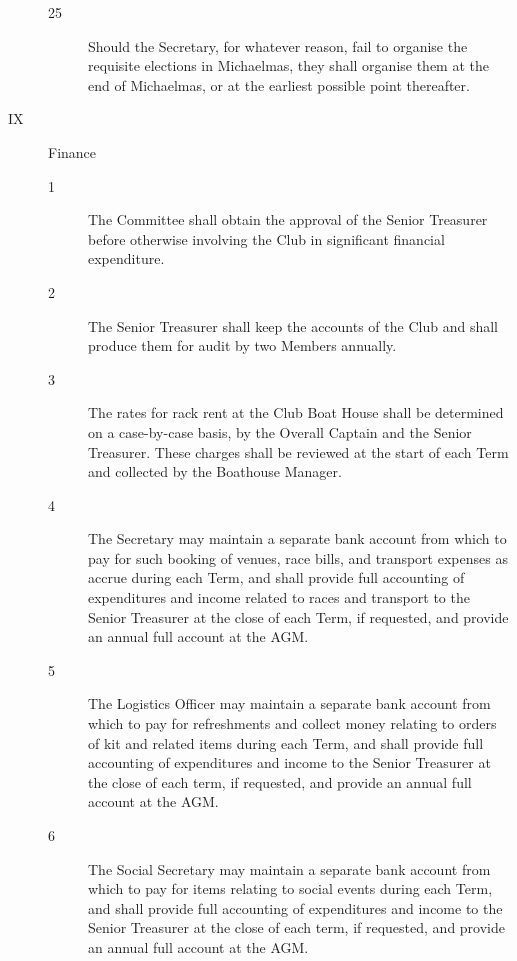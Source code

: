 \documentclass{article}
\begin{document}
\begin{description}
\begin{description}
		\item[25] Should the Secretary, for whatever reason, fail to organise the requisite
		elections in Michaelmas, they shall organise them at the end of
		Michaelmas, or at the earliest possible point thereafter.\\
	\end{description}

	\item[IX] Finance
	\begin{description}
		\item[1] The Committee shall obtain the approval of the Senior Treasurer before
		otherwise involving the Club in significant financial expenditure.\\
		
		\item[2] The Senior Treasurer shall keep the accounts of the Club and shall produce
		them for audit by two Members annually.\\
		
		\item[3] The rates for rack rent at the Club Boat House shall be determined on a
		case-by-case basis, by the Overall Captain and the Senior Treasurer. These
		charges shall be reviewed at the start of each Term and collected by the
		Boathouse Manager.\\
		
		\item[4] The Secretary may maintain a separate bank account from which to pay for
		such booking of venues, race bills, and transport expenses as accrue during
		each Term, and shall provide full accounting of expenditures and income
		related to races and transport to the Senior Treasurer at the close of each Term,
		if requested, and provide an annual full account at the AGM.\\
		
		\item[5] The Logistics Officer may maintain a separate bank account from which to
		pay for refreshments and collect money relating to orders of kit and related
		items during each Term, and shall provide full accounting of expenditures and
		income to the Senior Treasurer at the close of each term, if requested, and
		provide an annual full account at the AGM.\\
		
		\item[6] The Social Secretary may maintain a separate bank account from which to pay
		for items relating to social events during each Term, and shall provide full
		accounting of expenditures and income to the Senior Treasurer at the close of
		each term, if requested, and provide an annual full account at the AGM.\\
		

\end{description}
\end{description}
\end{document}
